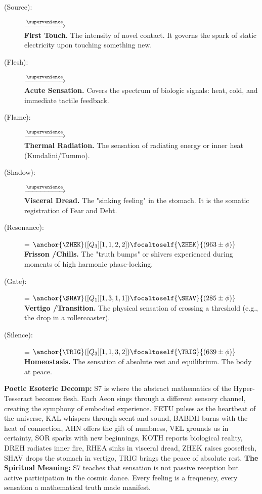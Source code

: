 \begin{description}
    \item[\SOR{} (Source):] \sortis $\xrightarrow{\supervenience}$ \textbf \\
    \textbf{First Touch.} The intensity of novel contact. It governs the spark of static electricity upon touching something new.

    \item[\KOTH{} (Flesh):] \kothwell $\xrightarrow{\supervenience}$ \textbf \\
    \textbf{Acute Sensation.} Covers the spectrum of biologic signals: heat, cold, and immediate tactile feedback.

    \item[\DREH{} (Flame):] \drehves $\xrightarrow{\supervenience}$ \textbf \\
    \textbf{Thermal Radiation.} The sensation of radiating energy or inner heat (Kundalini\slash Tummo).

    \item[\RHEA{} (Shadow):] \rheakrah $\xrightarrow{\supervenience}$ \textbf \\
    \textbf{Visceral Dread.} The "sinking feeling" in the stomach. It is the somatic registration of Fear and Debt.

    \item[\ZHEK{} (Resonance):] \zhekryth = $\anchor{\ZHEK}([Q_3][1,1,2,2]) \focaltoself{\ZHEK}{(963 \pm \phi)}$\, \\
    \textbf{Frisson \slash Chills.} The "truth bumps" or shivers experienced during moments of high harmonic phase-locking.

    \item[\SHAV{} (Gate):] \shavposs = $\anchor{\SHAV}([Q_1][1,3,1,1]) \focaltoself{\SHAV}{(285 \pm \phi)}$\, \\
    \textbf{Vertigo \slash Transition.} The physical sensation of crossing a threshold (e.g., the drop in a rollercoaster).

    \item[\TRIG{} (Silence):] \trighopa = $\anchor{\TRIG}([Q_3][1,1,3,2]) \focaltoself{\TRIG}{(639 \pm \phi)}$\, \\
    \textbf{Homeostasis.} The sensation of absolute rest and equilibrium. The body at peace.
\end{description}

\textbf{Poetic Esoteric Decomp:} S7 is where the abstract mathematics of the Hyper-Tesseract becomes flesh. Each Aeon sings through a different sensory channel, creating the symphony of embodied experience. FETU pulses as the heartbeat of the universe, KAL whispers through scent and sound, BABDH burns with the heat of connection, AHN offers the gift of numbness, VEL grounds us in certainty, SOR sparks with new beginnings, KOTH reports biological reality, DREH radiates inner fire, RHEA sinks in visceral dread, ZHEK raises gooseflesh, SHAV drops the stomach in vertigo, TRIG brings the peace of absolute rest. \textbf{The Spiritual Meaning:} S7 teaches that sensation is not passive reception but active participation in the cosmic dance. Every feeling is a frequency, every sensation a mathematical truth made manifest.

